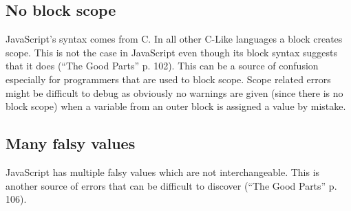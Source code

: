 	\subsection{No block scope} %
	\label{sub:no_block_scope}
		JavaScript’s syntax comes from C. In all other C-Like languages a block creates scope. This is not the case in JavaScript even though its block syntax suggests that it does (“The Good Parts” p. 102). This can be a source of confusion especially for programmers that are used to block scope. Scope related errors might be difficult to debug as obviously no warnings are given (since there is no block scope) when a variable from an outer block is assigned a value by mistake.

	\subsection{Many falsy values} %
	\label{sub:many_falsy_values}
		JavaScript has multiple falsy values which are not interchangeable. This is another source of errors that can be difficult to discover (“The Good Parts” p. 106).

